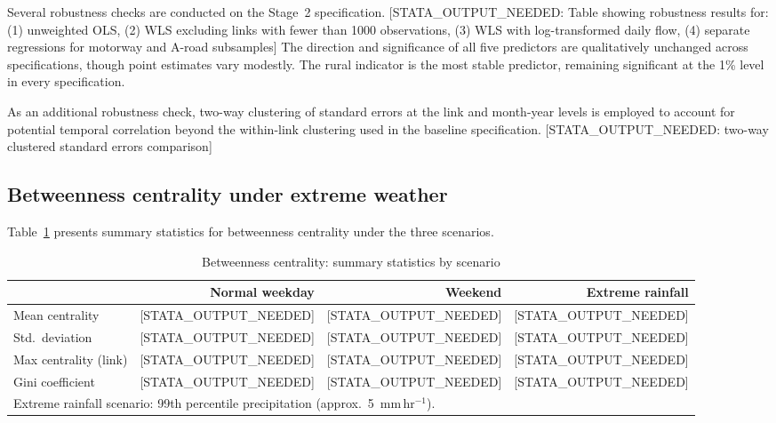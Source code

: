 \documentclass[review]{elsarticle}
\begin{document}
Several robustness checks are conducted on the Stage~2 specification. [STATA\_OUTPUT\_NEEDED: Table showing robustness results for: (1) unweighted OLS, (2) WLS excluding links with fewer than 1000 observations, (3) WLS with log-transformed daily flow, (4) separate regressions for motorway and A-road subsamples] The direction and significance of all five predictors are qualitatively unchanged across specifications, though point estimates vary modestly. The rural indicator is the most stable predictor, remaining significant at the 1\% level in every specification.

As an additional robustness check, two-way clustering of standard errors at the link and month-year levels is employed to account for potential temporal correlation beyond the within-link clustering used in the baseline specification. [STATA\_OUTPUT\_NEEDED: two-way clustered standard errors comparison]


\subsection{Betweenness centrality under extreme weather}
\label{sec:results:centrality}

Table~\ref{tab:centrality} presents summary statistics for betweenness centrality under the three scenarios.

\begin{table}[htbp]
\centering
\caption{Betweenness centrality: summary statistics by scenario}
\label{tab:centrality}
\begin{tabular}{lrrr}
\toprule
 & Normal weekday & Weekend & Extreme rainfall \\
\midrule
Mean centrality & [STATA\_OUTPUT\_NEEDED] & [STATA\_OUTPUT\_NEEDED] & [STATA\_OUTPUT\_NEEDED] \\
Std.\ deviation & [STATA\_OUTPUT\_NEEDED] & [STATA\_OUTPUT\_NEEDED] & [STATA\_OUTPUT\_NEEDED] \\
Max centrality (link) & [STATA\_OUTPUT\_NEEDED] & [STATA\_OUTPUT\_NEEDED] & [STATA\_OUTPUT\_NEEDED] \\
Gini coefficient & [STATA\_OUTPUT\_NEEDED] & [STATA\_OUTPUT\_NEEDED] & [STATA\_OUTPUT\_NEEDED] \\
\bottomrule
\multicolumn{4}{l}{\footnotesize Extreme rainfall scenario: 99th percentile precipitation (approx.\ 5~mm\,hr$^{-1}$).} \\
\end{tabular}
\end{table}
\end{document}
